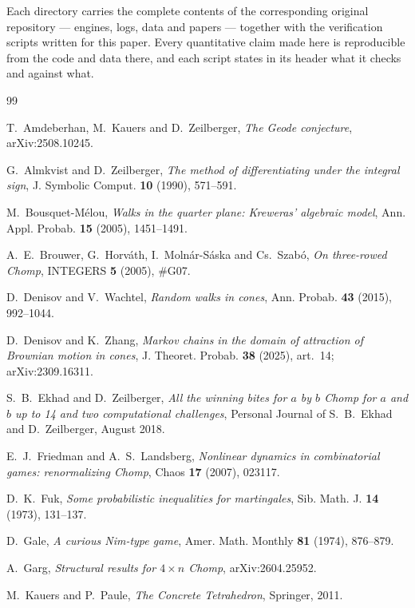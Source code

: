 \documentclass[11pt]{article}
\theoremstyle{definition}
\begin{document}
Each directory carries the complete contents of the corresponding original
repository --- engines, logs, data and papers --- together with the
verification scripts written for this paper. Every quantitative claim made
here is reproducible from the code and data there, and each script states in
its header what it checks and against what.

\begin{thebibliography}{99}

 T.~Amdeberhan, M.~Kauers and D.~Zeilberger, \emph{The Geode
conjecture}, arXiv:2508.10245.

 G.~Almkvist and D.~Zeilberger, \emph{The method of differentiating
under the integral sign}, J. Symbolic Comput. \textbf{10} (1990), 571--591.

 M.~Bousquet-M\'elou, \emph{Walks in the quarter plane: Kreweras'
algebraic model}, Ann. Appl. Probab. \textbf{15} (2005), 1451--1491.

 A.~E.~Brouwer, G.~Horv\'ath, I.~Moln\'ar-S\'aska and
Cs.~Szab\'o, \emph{On three-rowed Chomp}, INTEGERS \textbf{5} (2005), \#G07.

 D.~Denisov and V.~Wachtel, \emph{Random walks in cones},
Ann. Probab. \textbf{43} (2015), 992--1044.

 D.~Denisov and K.~Zhang, \emph{Markov chains in the domain of
attraction of Brownian motion in cones}, J. Theoret. Probab. \textbf{38}
(2025), art.~14; arXiv:2309.16311.

 S.~B.~Ekhad and D.~Zeilberger, \emph{All the winning bites for $a$
by $b$ Chomp for $a$ and $b$ up to 14 and two computational challenges},
Personal Journal of S.~B.~Ekhad and D.~Zeilberger, August 2018.

 E.~J.~Friedman and A.~S.~Landsberg, \emph{Nonlinear dynamics in
combinatorial games: renormalizing Chomp}, Chaos \textbf{17} (2007), 023117.

 D.~K.~Fuk, \emph{Some probabilistic inequalities for
martingales}, Sib. Math. J. \textbf{14} (1973), 131--137.

 D.~Gale, \emph{A curious Nim-type game}, Amer. Math. Monthly
\textbf{81} (1974), 876--879.

 A.~Garg, \emph{Structural results for $4\times n$ Chomp},
arXiv:2604.25952.

 M.~Kauers and P.~Paule, \emph{The Concrete Tetrahedron},
Springer, 2011.


\end{thebibliography}
\end{document}
